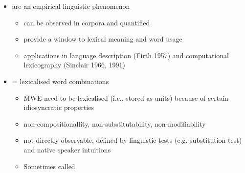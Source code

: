 \documentclass[a4paper,landscape,headrule,footrule,dvips]{foils}
\begin{document}
\begin{CJK}{UTF8}{min}
\begin{itemize}
\item {} are an empirical linguistic phenomenon
\begin{itemize}
\item can be observed in corpora and quantified
\item provide a window to lexical meaning and word usage
\item applications in language description (Firth 1957) and
computational lexicography (Sinclair 1966, 1991)
\end{itemize}
\item {} = lexicalised word combinations
\begin{itemize}
\item MWE need to be lexicalised (i.e., stored as units) because
of certain idiosyncratic properties
\item non-compositionallity, non-substitutability, non-modifiability
  \citep{Manning:Schuetze:1999}
\item not directly observable, defined by linguistic tests
(e.g. substitution test) and native speaker intuitions
\item Sometimes called  
\end{itemize}
\end{itemize}






\end{CJK}
\end{document}
